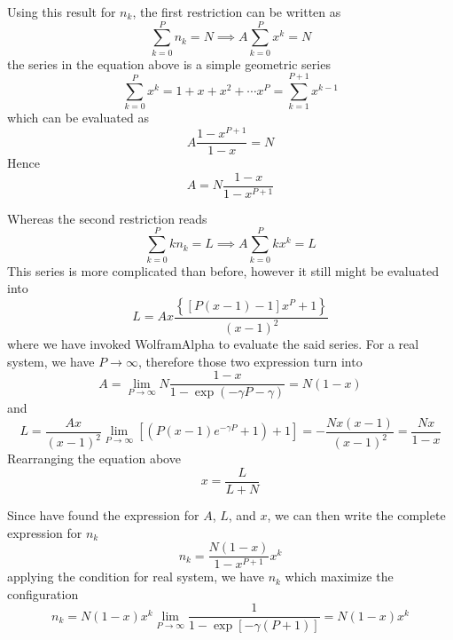 \documentclass[../../../Main.tex]{subfiles}
\begin{document}
Using this result for $n_k$, the first restriction can be written as
\begin{equation*}
    \sum_{k=0}^{P}n_k=N\implies A\sum_{k=0}^{P}x^k=N
\end{equation*}
the series in the equation above is a simple geometric series
\begin{equation*}
    \sum_{k=0}^{P}x^k=1+x+x^2+\cdots x^P=\sum_{k=1}^{P+1}x^{k-1}
\end{equation*}
which can be evaluated as 
\begin{equation*}
    A\frac{1-x^{P+1}}{1-x}=N
\end{equation*}
Hence 
\begin{equation*}
    A=N\frac{1-x}{1-x^{P+1}}
\end{equation*}

Whereas the second restriction reads
\begin{equation*}
    \sum_{k=0}^{P}kn_k=L\implies A\sum_{k=0}^{P}kx^k=L
\end{equation*}
This series is more complicated than before, however it still might be evaluated into 
\begin{equation*}
    L=Ax\frac{\left\{\left[P\left(x-1\right)-1\right]x^P+1\right\}}{(x-1)^2}
\end{equation*}  
where we have invoked WolframAlpha to evaluate the said series. For a real\textsuperscript{\texttrademark} system, we have $P\rightarrow\infty $, therefore those two expression turn into
\begin{equation*}
    A=\lim_{P\rightarrow\infty}N\frac{1-x}{1-\exp (-\gamma P-\gamma)}=N(1-x)
\end{equation*}  
and
\begin{equation*} 
    L=\frac{Ax}{(x-1)^2}\lim_{P\rightarrow\infty}\left[(P(x-1)e^{-\gamma P}+1)+1\right]=-\frac{Nx(x-1)}{(x-1)^2}=\frac{Nx}{1-x}
\end{equation*}
Rearranging the equation above 
\begin{equation*}
    x=\frac{L}{L+N}
\end{equation*}

Since have found the expression for $A$, $L$, and $x$, we can then write the complete expression for $n_k$
\begin{equation*}
    n_k=\frac{N(1-x)}{1-x^{P+1}}x^k
\end{equation*}
applying the condition for real system, we have $n_k$ which maximize the configuration
\begin{equation*}
    n_k=N(1-x)x^k\lim_{P\rightarrow\infty}\frac{1}{1-\exp\left[-\gamma (P+1)\right]}=N(1-x)x^k
\end{equation*}
\end{document}
